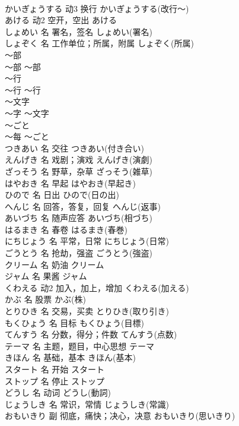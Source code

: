 \documentclass[8pt]{extreport}
\begin{document}
\begin{CJK}{UTF8}{min}
\\	かいぎょうする	动3	换行	かいぎょうする(改行～)	
\\	あける	动2	空开，空出	あける	
\\	しょめい	名	署名，签名	しょめい(署名)	
\\	しょぞく	名	工作单位；所属，附属	しょぞく(所属)	
\\	～部	
\\	～部	～部	
\\	～行	
\\	～行	～行	
\\	～文字	
\\	～字	～文字	
\\	～ごと	
\\	～每	～ごと	
\\	つきあい	名	交往	つきあい(付き合い)	
\\	えんげき	名	戏剧；演戏	えんげき(演劇)	
\\	ざっそう	名	野草，杂草	ざっそう(雑草)	
\\	はやおき	名	早起	はやおき(早起き)	
\\	ひので	名	日出	ひので(日の出)	
\\	へんじ	名	回答，答复，回复	へんじ(返事)	
\\	あいづち	名	随声应答	あいづち(相づち)	
\\	はるまき	名	春卷	はるまき(春巻)	
\\	にちじょう	名	平常，日常	にちじょう(日常)	
\\	ごうとう	名	抢劫，强盗	ごうとう(強盗)	
\\	クリーム	名	奶油	クリーム	
\\	ジャム	名	果酱	ジャム	
\\	くわえる	动2	加入，加上，增加	くわえる(加える)	
\\	かぶ	名	股票	かぶ(株)	
\\	とりひき	名	交易，买卖	とりひき(取り引き)	
\\	もくひょう	名	目标	もくひょう(目標)	
\\	てんすう	名	分数，得分；件数	てんすう(点数)	
\\	テーマ	名	主题，题目，中心思想	テーマ	
\\	きほん	名	基础，基本	きほん(基本)	
\\	スタート	名	开始	スタート	
\\	ストップ	名	停止	ストップ	
\\	どうし	名	动词	どうし(動詞)	
\\	じょうしき	名	常识，常情	じょうしき(常識)	
\\	おもいきり	副	彻底，痛快；决心，决意	おもいきり(思いきり)	

\end{CJK}
\end{document}
